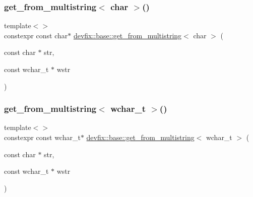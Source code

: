 \mbox{\label{namespacedevfix_1_1base_a1d6f6a1a767fa54cd6ff94ae14b43e90}} 
\subsubsection{\texorpdfstring{get\+\_\+from\+\_\+multistring$<$ char $>$()}{get\_from\_multistring< char >()}}
{\footnotesize\ttfamily template$<$$>$ \\
constexpr const char$\ast$ \hyperlink{namespacedevfix_1_1base_a84282bc5458412dfed5ce8b039a70519}{devfix\+::base\+::get\+\_\+from\+\_\+multistring}$<$ char $>$ (\begin{DoxyParamCaption}\item[{const char $\ast$}]{str,  }\item[{const wchar\+\_\+t $\ast$}]{wstr }\end{DoxyParamCaption})}

\mbox{\label{namespacedevfix_1_1base_a100ea64654a747f262206d9e4b31e6f2}} 
\subsubsection{\texorpdfstring{get\+\_\+from\+\_\+multistring$<$ wchar\+\_\+t $>$()}{get\_from\_multistring< wchar\_t >()}}
{\footnotesize\ttfamily template$<$$>$ \\
constexpr const wchar\+\_\+t$\ast$ \hyperlink{namespacedevfix_1_1base_a84282bc5458412dfed5ce8b039a70519}{devfix\+::base\+::get\+\_\+from\+\_\+multistring}$<$ wchar\+\_\+t $>$ (\begin{DoxyParamCaption}\item[{const char $\ast$}]{str,  }\item[{const wchar\+\_\+t $\ast$}]{wstr }\end{DoxyParamCaption})}

